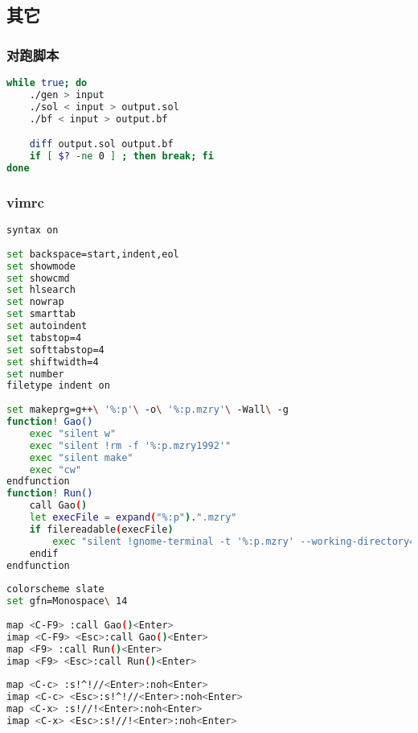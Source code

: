 \subsection{其它}
	\subsubsection{对跑脚本}
	\begin{lstlisting}[language=sh]
while true; do
	./gen > input
	./sol < input > output.sol
	./bf < input > output.bf

	diff output.sol output.bf
	if [ $? -ne 0 ] ; then break; fi
done
	\end{lstlisting}

	\subsubsection{vimrc}
	\begin{lstlisting}[language=sh]
syntax on
 
set backspace=start,indent,eol
set showmode
set showcmd
set hlsearch
set nowrap
set smarttab
set autoindent
set tabstop=4
set softtabstop=4
set shiftwidth=4
set number
filetype indent on
 
set makeprg=g++\ '%:p'\ -o\ '%:p.mzry'\ -Wall\ -g
function! Gao()
	exec "silent w"
	exec "silent !rm -f '%:p.mzry1992'"
	exec "silent make"
	exec "cw"
endfunction
function! Run()
	call Gao()
	let execFile = expand("%:p").".mzry"
	if filereadable(execFile)
		exec "silent !gnome-terminal -t '%:p.mzry' --working-directory='%:p:h' -x /usr/bin/cb_console_runner '%:p.mzry'"
	endif
endfunction
 
colorscheme slate
set gfn=Monospace\ 14
 
map <C-F9> :call Gao()<Enter>
imap <C-F9> <Esc>:call Gao()<Enter>
map <F9> :call Run()<Enter>
imap <F9> <Esc>:call Run()<Enter>
 
map <C-c> :s!^!//<Enter>:noh<Enter>
imap <C-c> <Esc>:s!^!//<Enter>:noh<Enter>
map <C-x> :s!//!<Enter>:noh<Enter>
imap <C-x> <Esc>:s!//!<Enter>:noh<Enter>
	\end{lstlisting}
